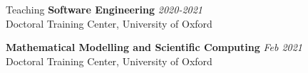 \begin{rSection}{Teaching}
    {\bf Software Engineering} \hfill {\em 2020-2021} \\ 
    Doctoral Training Center, University of Oxford

    {\bf Mathematical Modelling and Scientific Computing} \hfill {\em Feb 2021} \\
    Doctoral Training Center, University of Oxford
\end{rSection}